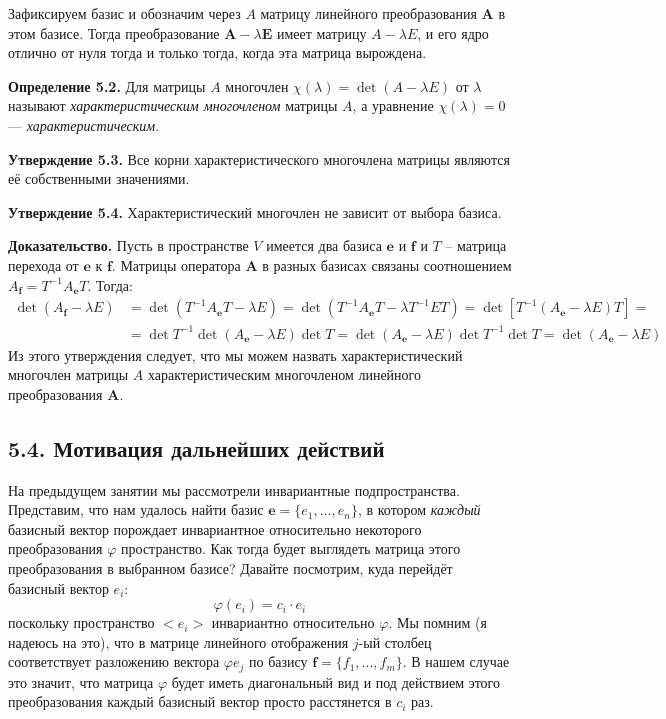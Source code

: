 \documentclass[a4paper, 12pt]{article}
\begin{document}
\begin{spacing}{1.5}
Зафиксируем базис и обозначим через $A$ матрицу линейного преобразования $\mathbf{A}$ в этом базисе. Тогда преобразование $\mathbf{A} - \lambda \mathbf{E}$ имеет матрицу $A - \lambda E$, и его ядро отлично от нуля тогда и только тогда, когда эта матрица вырождена. 

\textbf{Определение 5.2.} Для матрицы $A$ многочлен $\chi (\lambda) = \det (A - \lambda E)$ от $\lambda$ называют \textit{характеристическим многочленом} матрицы $A$, а уравнение $\chi (\lambda) = 0$ — \textit{характеристическим}.

\textbf{Утверждение 5.3.} Все корни характеристического многочлена матрицы являются её собственными значениями.

\textbf{Утверждение 5.4.} Характеристический многочлен не зависит от выбора базиса.

\textbf{Доказательство.} Пусть в пространстве $V$ имеется два базиса $\textbf{e}$ и $\textbf{f}$ и $T$ -- матрица перехода от $\textbf{e}$ к $\textbf{f}$. Матрицы оператора $\mathbf{A}$ в разных базисах связаны соотношением $A_{\textbf{f}} = T^{-1} A_{\textbf{e}} T$. Тогда:
\vspace{-0.4cm}
\begin{align*}
    \det (A_{\textbf{f}} - \lambda E) & = \det (T^{-1} A_{\textbf{e}} T - \lambda E) = \det (T^{-1} A_{\textbf{e}} T - \lambda T^{-1} E T) = \det \left [ T^{-1} (A_{\textbf{e}} - \lambda E) T \right ] = \\
    & = \det T^{-1} \det (A_{\textbf{e}} - \lambda E) \det T = \det (A_{\textbf{e}} - \lambda E) \det T^{-1} \det T = \det (A_{\textbf{e}} - \lambda E)
\end{align*}
Из этого утверждения следует, что мы можем назвать характеристический многочлен матрицы $A$ характеристическим многочленом линейного преобразования $\mathbf{A}$.


\subsection*{5.4. Мотивация дальнейших действий}

На предыдущем занятии мы рассмотрели инвариантные подпространства. Представим, что нам удалось найти базис $\textbf{e} = \{ e_1, ..., e_n \}$, в котором \textit{каждый} базисный вектор порождает инвариантное относительно некоторого преобразования $\varphi$ пространство. Как тогда будет выглядеть матрица этого преобразования в выбранном базисе? Давайте посмотрим, куда перейдёт базисный вектор $e_i$:
$$\varphi (e_i) = c_i \cdot e_i$$
поскольку пространство $<e_i>$ инвариантно относительно $\varphi$. Мы помним (я надеюсь на это), что в матрице линейного отображения $j$-ый столбец соответствует разложению вектора $\varphi e_j$ по базису $\textbf{f} = \{ f_1, ..., f_m \}$. В нашем случае это значит, что матрица $\varphi$ будет иметь диагональный вид и под действием этого преобразования каждый базисный вектор просто расстянется в $c_i$ раз.


\end{spacing}
\end{document}
